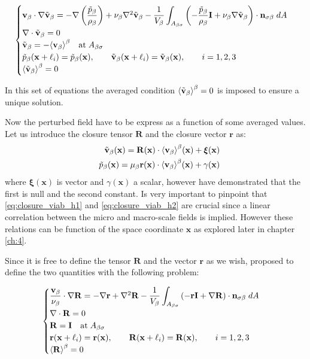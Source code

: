 \begin{eqnarray}
\begin{cases}
\textbf{v}_{\beta} \cdot \nabla \tilde{\textbf{v}}_{\beta} = -\nabla \left(\dfrac{\tilde{p}_{\beta}}{\rho_{\beta}}\right) + \nu_{\beta} \nabla^2 \tilde{\textbf{v}}_{\beta} - \dfrac{1}{V_\beta} \displaystyle \int_{A_{\beta \sigma}} \left(-\dfrac{\tilde{p}_{\beta}}{\rho_{\beta}} \mathbf{I}  + \nu_{\beta} \nabla \tilde{\textbf{v}}_{\beta} \right) \cdot \mathbf{n}_{\sigma \beta} \;dA  \\
\nabla \cdot \tilde{\textbf{v}}_{\beta} = 0  \\
\tilde{\textbf{v}}_{\beta} = -{\left< \textbf{v}_{\beta} \right>}^{\beta} \quad \textrm{at} \; A_{\beta \sigma} \\
\tilde{p}_{\beta}(\mathbf{x} +\ell_i) = \tilde{p}_{\beta}(\mathbf{x}), \qquad \tilde{\textbf{v}}_{\beta}(\mathbf{x} +\ell_i) = \tilde{\textbf{v}}_{\beta}(\mathbf{x}), \qquad i=1,2,3 \\
{\left< \tilde{\textbf{v}}_{\beta} \right>}^{\beta} = 0
\end{cases}
\label{eq:vans_mom_2}
\end{eqnarray}

In this set of equations the averaged condition ${\left< \tilde{\textbf{v}}_{\beta} \right>}^{\beta} = 0$ is imposed to ensure a unique solution.

Now the perturbed field have to be express as a function of some averaged values. Let us introduce the closure tensor $\mathbf{R}$ and  the closure vector $\mathbf{r}$ as:
\begin{eqnarray}
&& \tilde{\textbf{v}}_{\beta}(\mathbf{x}) = \mathbf{R}(\mathbf{x})  \cdot {\left< \textbf{v}_{\beta}\right>}^{\beta}(\mathbf{x})  +\boldsymbol{\xi}(\mathbf{x})  	\label{eq:closure_viab_h1} \\
&& \tilde{p}_{\beta}(\mathbf{x})  = \mu_{\beta} \mathbf{r}(\mathbf{x})  \cdot {\left< \textbf{v}_{\beta}\right>}^{\beta}(\mathbf{x})  + \gamma(\mathbf{x}) \label{eq:closure_viab_h2}
\end{eqnarray}
where $\boldsymbol{\xi}(\mathbf{x})$ is vector and $\gamma(\mathbf{x})$ a scalar, however \citet{whitaker1996forchheimer} have demonstrated that the first is null and the second constant.
Is very important to pinpoint that \eqref{eq:closure_viab_h1} and \eqref{eq:closure_viab_h2} are crucial since a linear correlation between the micro and macro-scale fields is implied.
However these relations can be function of the space coordinate $\mathbf{x}$ as explored later in chapter \ref{ch:4}.

Since it is free to define the tensor $\mathbf{R}$ and the vector $\mathbf{r}$ as we wish, \citet{whitaker1996forchheimer} proposed to define the two quantities with the following problem:

\begin{eqnarray}
	\begin{cases}
		\dfrac{\textbf{v}_{\beta}}{\nu_{\beta}} \cdot  \nabla \mathbf{R} = -\nabla \mathbf{r} + \nabla^2 \mathbf{R} - \dfrac{1}{V_\beta} \displaystyle \int_{A_{\beta \sigma}} \left(-\mathbf{r}\mathbf{I}  +  \nabla \mathbf{R} \right) \cdot \mathbf{n}_{\sigma \beta} \;dA  \\
		\nabla \cdot \mathbf{R} = 0  \\
		\mathbf{R} = \mathbf{I} \quad \textrm{at} \; A_{\beta \sigma} \\
		\mathbf{r}(\mathbf{x} +\ell_i) = \mathbf{r}(\mathbf{x}), \qquad \mathbf{R}(\mathbf{x} +\ell_i) = \mathbf{R}(\mathbf{x}), \qquad i=1,2,3 \\
		{\left< \mathbf{R} \right>}^{\beta} = 0
	\end{cases}
\label{eq:R_problem}
\end{eqnarray}

